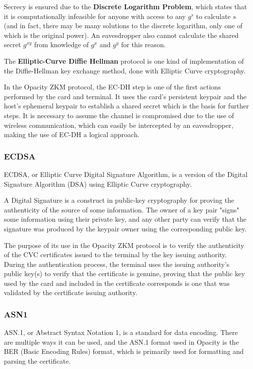 \documentclass[12pt]{article}
\begin{document}
Secrecy is ensured due to the \textbf{Discrete Logarithm Problem}, which states that it is computationally infeasible for anyone with access to any $g^s$ to calculate $s$ (and in fact, there may be many solutions to the discrete logarithm, only one of which is the original power). An eavesdropper also cannot calculate the shared secret $g^{xy}$ from knowledge of $g^x$ and $g^y$ for this reason.

The \textbf{Elliptic-Curve Diffie Hellman} protocol is one kind of implementation of the Diffie-Hellman key exchange method, done with Elliptic Curve cryptography.

In the Opacity ZKM protocol, the EC-DH step is one of the first actions performed by the card and terminal. It uses the card's persistent keypair and the host's ephemeral keypair to establish a shared secret which is the basis for further steps. It is necessary to assume the channel is compromised due to the use of wireless communication, which can easily be intercepted by an eavesdropper, making the use of EC-DH a logical approach.


\subsubsection{ECDSA}
ECDSA, or Elliptic Curve Digital Signature Algorithm, is a version of the Digital Signature Algorithm (DSA) using Elliptic Curve cryptography.

A Digital Signature is a construct in public-key cryptography for proving the authenticity of the source of some information. The owner of a key pair "signs" some information using their private key, and any other party can verify that the signature was produced by the keypair owner using the corresponding public key. 


The purpose of its use in the Opacity ZKM protocol is to verify the authenticity of the CVC certificates issued to the terminal by the key issuing authority. During the authentication process, the terminal uses the issuing authority's public key(s) to verify that the certificate is genuine, proving that the public key used by the card and included in the certificate corresponds is one that was validated by the certificate issuing authority.

\subsubsection{ASN1}
ASN.1, or Abstract Syntax Notation 1, is a standard for data encoding. There are multiple ways it can be used, and the ASN.1 format used in Opacity is the BER (Basic Encoding Rules) format, which is primarily used for formatting and parsing the certificate. 
\end{document}
